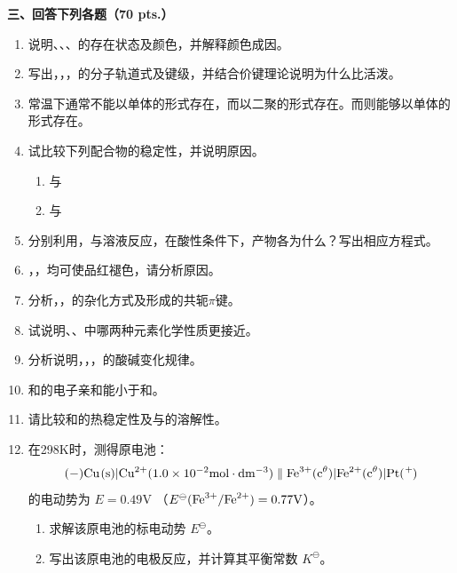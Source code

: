 \vspace{0.5cm}
\noindent\textbf{三、回答下列各题（70 pts.）}

\begin{enumerate}[label=\arabic*., start=1, itemsep=1.5ex]
    \item 说明、、、的存在状态及颜色，并解释颜色成因。
    \item 写出，，，的分子轨道式及键级，并结合价键理论说明为什么比活泼。
    \item 常温下通常不能以单体的形式存在，而以二聚的形式存在。而则能够以单体的形式存在。
    \item 试比较下列配合物的稳定性，并说明原因。
    \begin{enumerate}[label=(\alph*), itemsep=1ex]
        \item {} 与 
        \item {} 与 
    \end{enumerate}
    \item 分别利用，与溶液反应，在酸性条件下，产物各为什么？写出相应方程式。
    \item {}，，均可使品红褪色，请分析原因。
    \item 分析，，的杂化方式及形成的共轭$\pi$键。
    \item 试说明、、中哪两种元素化学性质更接近。
    \item 分析说明，，，的酸碱变化规律。
    \item {}和的电子亲和能小于和。
    \item 请比较和的热稳定性及与的溶解性。
    \item 在298K时，测得原电池：
    \[
    (-)\ce{Cu(s)}|\ce{Cu^{2+}}(1.0 \times 10^{-2}\mathrm{mol\cdot dm^{-3}}) \parallel \ce{Fe^{3+}}(\ce{c^\theta})|\ce{Fe^{2+}}(\ce{c^\theta})|\ce{Pt(+)}
    \]
    的电动势为 $E = 0.49\mathrm{V}$ （$E^\ominus(\ce{Fe^{3+}/Fe^{2+}}) = 0.77\mathrm{V}$）。
    \begin{enumerate}[label=(\arabic*), itemsep=1ex]
        \item 求解该原电池的标电动势 $E^\ominus$。
        \item 写出该原电池的电极反应，并计算其平衡常数 $K^\ominus$。
    \end{enumerate}
\end{enumerate}

